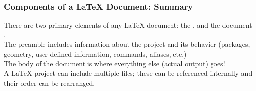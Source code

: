 \begin{frame}[fragile]
\frametitle{Components of a \LaTeX{} Document: Summary}
    There are two primary elements of any \LaTeX{} document: the , and the document . \\[\baselineskip] \pause
    The preamble includes information about the project and its behavior (packages, geometry, user-defined information, commands, aliases, etc.) \\[\baselineskip] \pause
    The body of the document is where everything else (actual output) goes! \\[\baselineskip] \pause
    A \LaTeX{} project can include multiple files; these can be referenced internally and their order can be rearranged.
\end{frame}
